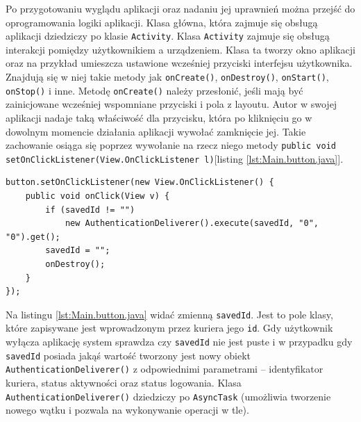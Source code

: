 \documentclass[eng,printmode,oneside]{mgr}
\begin{document}
Po przygotowaniu wyglądu aplikacji oraz nadaniu jej uprawnień można przejść
do oprogramowania logiki aplikacji. Klasa główna, która zajmuje się obsługą
aplikacji dziedziczy po klasie \texttt{Activity}. Klasa \texttt{Activity} zajmuje
się obsługą interakcji pomiędzy użytkownikiem a urządzeniem. Klasa ta tworzy okno aplikacji
oraz na przykład umieszcza ustawione wcześniej przyciski interfejsu użytkownika.
Znajdują się w niej takie metody jak \texttt{onCreate()}, \texttt{onDestroy()},
\texttt{onStart()}, \texttt{onStop()} i inne. Metodę \texttt{onCreate()} należy
przesłonić, jeśli mają być zainicjowane wcześniej wspomniane przyciski i pola z layoutu. Autor w swojej aplikacji nadaje taką
właściwość dla przycisku, która po kliknięciu go w dowolnym momencie
działania aplikacji wywołać zamknięcie jej. Takie zachowanie osiąga się
poprzez wywołanie na rzecz niego metody \texttt{public void
setOnClickListener(View.OnClickListener l)}[listing \ref{lst:Main.button.java}].

\begin{lstlisting}[caption=Ustawienie właściwości przycisku
``Off'' w głównej klasie aplikacji mobilnej w
metodzie onCreate(),label=lst:Main.button.java] 
button.setOnClickListener(new View.OnClickListener() { 
	public void onClick(View v) { 
		if (savedId != "")
			new AuthenticationDeliverer().execute(savedId, "0", "0").get();
		savedId = "";
		onDestroy();
	}
});
\end{lstlisting}

Na listingu \ref{lst:Main.button.java} widać zmienną \texttt{savedId}. 
Jest to pole klasy, które zapisywane jest wprowadzonym przez kuriera jego \texttt{id}. Gdy użytkownik wyłącza
aplikację system sprawdza czy \texttt{savedId} nie jest puste i w przypadku gdy
\texttt{savedId} posiada jakąś wartość tworzony jest nowy obiekt
\texttt{AuthenticationDeliverer()} z odpowiednimi parametrami -- identyfikator kuriera,
 status aktywności oraz status logowania. Klasa
\texttt{AuthenticationDeliverer()} dziedziczy po \texttt{AsyncTask} (umożliwia
tworzenie nowego wątku i pozwala na wykonywanie operacji w tle). 
\end{document}
